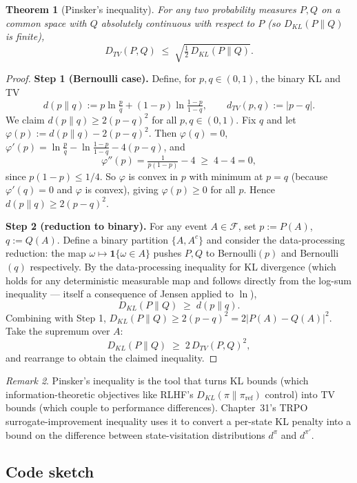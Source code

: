 \documentclass[11pt]{article}
\newtheorem{theorem}{Theorem}[section]
\theoremstyle{remark}
\newtheorem{remark}[theorem]{Remark}
\begin{document}
\begin{theorem}[Pinsker's inequality]
\label{thm:pinsker}
For any two probability measures $P, Q$ on a common space with $Q$ absolutely continuous with respect to $P$ (so $D_{KL}(P \| Q)$ is finite),
\[
D_{TV}(P, Q) \;\le\; \sqrt{\tfrac{1}{2}\, D_{KL}(P \| Q)}.
\]
\end{theorem}

\begin{proof}
\textbf{Step 1 (Bernoulli case).} Define, for $p, q \in (0,1)$, the binary KL and TV
\[
  d(p \| q) := p \ln\tfrac{p}{q} + (1-p)\ln\tfrac{1-p}{1-q}, \qquad d_{TV}(p, q) := |p - q|.
\]
We claim $d(p \| q) \ge 2 (p-q)^2$ for all $p, q \in (0,1)$. Fix $q$ and let $\varphi(p) := d(p \| q) - 2(p - q)^2$. Then $\varphi(q) = 0$, $\varphi'(p) = \ln\tfrac{p}{q} - \ln\tfrac{1-p}{1-q} - 4(p-q)$, and
\[
  \varphi''(p) = \tfrac{1}{p(1-p)} - 4 \;\ge\; 4 - 4 = 0,
\]
since $p(1-p) \le 1/4$. So $\varphi$ is convex in $p$ with minimum at $p = q$ (because $\varphi'(q) = 0$ and $\varphi$ is convex), giving $\varphi(p) \ge 0$ for all $p$. Hence $d(p \| q) \ge 2 (p - q)^2$.

\textbf{Step 2 (reduction to binary).} For any event $A \in \mathcal{F}$, set $p := P(A)$, $q := Q(A)$. Define a binary partition $\{A, A^c\}$ and consider the data-processing reduction: the map $\omega \mapsto \mathbf{1}\{\omega \in A\}$ pushes $P, Q$ to Bernoulli$(p)$ and Bernoulli$(q)$ respectively. By the data-processing inequality for KL divergence (which holds for any deterministic measurable map and follows directly from the log-sum inequality --- itself a consequence of Jensen applied to $\ln$),
\[
  D_{KL}(P \| Q) \;\ge\; d(p \| q).
\]
Combining with Step 1, $D_{KL}(P \| Q) \ge 2(p - q)^2 = 2 |P(A) - Q(A)|^2$. Take the supremum over $A$:
\[
  D_{KL}(P \| Q) \;\ge\; 2 \, D_{TV}(P, Q)^2,
\]
and rearrange to obtain the claimed inequality.
\end{proof}

\begin{remark}
Pinsker's inequality is the tool that turns KL bounds (which information-theoretic objectives like RLHF's $D_{KL}(\pi \| \pi_{\mathrm{ref}})$ control) into TV bounds (which couple to performance differences). Chapter~31's TRPO surrogate-improvement inequality uses it to convert a per-state KL penalty into a bound on the difference between state-visitation distributions $d^\pi$ and $d^{\pi'}$.
\end{remark}

\subsection*{Code sketch}
\end{document}
